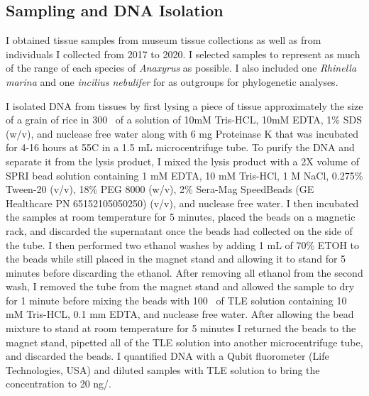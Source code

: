 \subsection{Sampling and DNA Isolation}
I obtained tissue samples from museum tissue collections as well as from individuals   
I collected from 2017 to 2020. I selected samples to represent as much
of the range of each species of \textit{Anaxyrus} as possible.
I also included one \textit{Rhinella marina} and one \textit{incilius nebulifer} 
for as outgroups for phylogenetic analyses.

I isolated DNA from tissues by first lysing a piece of tissue approximately 
the size of a grain of rice in 300 \uL\ of a solution of 10mM Tris-HCL, 10mM EDTA, 
1\% SDS (w/v), and nuclease free water along with 6 mg Proteinase K that was 
incubated for 4-16 hours at 55\degree C in a 1.5 mL microcentrifuge tube.  
To purify the DNA and separate it from the lysis product, I mixed the lysis 
product with a 2X volume of SPRI bead solution containing 1 mM EDTA,  
10 mM Tris-HCl, 1 M NaCl, 0.275\% Tween-20 (v/v), 18\% PEG 8000 (w/v), 
2\% Sera-Mag SpeedBeads (GE Healthcare PN 65152105050250) (v/v), and nuclease free water.
I then incubated the samples at room temperature for 5 minutes, placed the 
beads on a magnetic rack, and discarded the supernatant once the beads had collected
on the side of the tube.  
I then performed two ethanol washes by adding 1 mL of 70\% ETOH to the beads
while still placed in the magnet stand and allowing it to stand for 5 minutes
before discarding the ethanol. 
After removing all ethanol from the second wash, I removed the tube from the magnet 
stand and allowed the sample to dry for 1 minute before mixing the beads with 100 \uL\ of 
TLE solution containing 10 mM Tris-HCL, 0.1 mm EDTA, and nuclease free water.
After allowing the bead mixture to stand at room temperature for 5 minutes I returned
the beads to the magnet stand, pipetted all of the TLE solution into another 
microcentrifuge tube, and discarded the beads. I quantified DNA with a Qubit
fluorometer (Life Technologies, USA) and diluted samples with TLE solution to 
bring the concentration to 20 ng/\uL.

